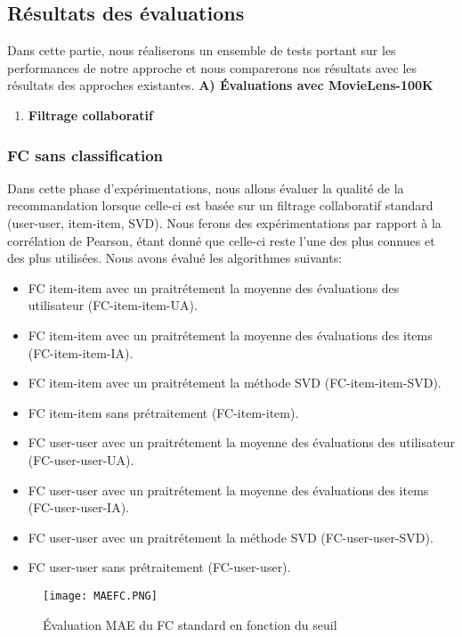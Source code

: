 \subsection{Résultats des évaluations}
Dans cette partie, nous réaliserons un ensemble de tests portant sur les performances de notre approche et nous comparerons nos résultats avec les résultats des approches existantes. 
\textbf{A) Évaluations avec MovieLens-100K}
\begin{enumerate}[nosep,label=\textbf{\arabic*)}]
	\item \textbf{Filtrage collaboratif}
\end{enumerate}
\subsubsection*{FC sans classification}
Dans cette phase d’expérimentations, nous allons évaluer la qualité de la recommandation lorsque celle-ci est basée sur un filtrage collaboratif standard (user-user, item-item, SVD). Nous ferons des expérimentations par rapport à la corrélation de Pearson, étant donné que celle-ci reste l’une des plus connues et des plus utilisées.
Nous avons évalué les algorithmes suivants:
\begin{itemize}
	\item  FC item-item avec un praitrétement la moyenne des évaluations des utilisateur 
	(FC-item-item-UA).
	\item  FC item-item avec un praitrétement la moyenne des évaluations des items (FC-item-item-IA).
	\item  FC item-item avec un praitrétement la méthode SVD (FC-item-item-SVD).
	\item FC item-item sans prétraitement (FC-item-item).
	\item  FC user-user avec un praitrétement la moyenne des évaluations des utilisateur (FC-user-user-UA).
	\item  FC user-user avec un praitrétement la moyenne des évaluations des items (FC-user-user-IA).
	\item  FC user-user avec un praitrétement la méthode SVD (FC-user-user-SVD).
	\item FC user-user sans prétraitement (FC-user-user).	
\end{itemize}
\begin{figure}[H]
	\centering
	\texttt{[image: MAEFC.PNG]}
	\caption{Évaluation MAE du FC standard en fonction du seuil}
	\label{fig:FCMAE}
\end{figure}

